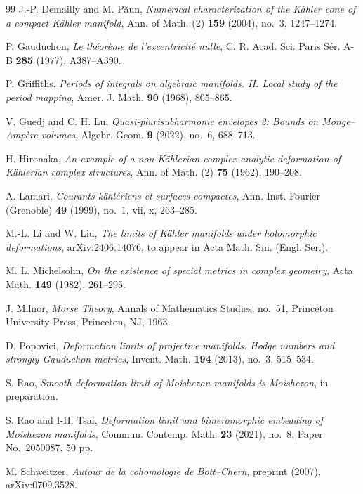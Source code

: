 \documentclass[11pt,letterpaper]{amsart}
\numberwithin{equation}{section}
\begin{document}
\begin{thebibliography}{99}
J.-P. Demailly and M. P\u{a}un, \textit{Numerical characterization of the K\"ahler cone of a compact K\"ahler manifold}, Ann. of Math. (2) \textbf{159} (2004), no.~3, 1247--1274.

P. Gauduchon, \textit{Le th\'eor\`eme de l'excentricit\'e nulle}, C. R. Acad. Sci. Paris S\'er. A-B \textbf{285} (1977), A387--A390.

P. Griffiths, \textit{Periods of integrals on algebraic manifolds. II. Local study of the period mapping}, Amer. J. Math. \textbf{90} (1968), 805--865.

V. Guedj and C. H. Lu, \textit{Quasi-plurisubharmonic envelopes 2: Bounds on Monge--Amp\`ere volumes}, Algebr. Geom. \textbf{9} (2022), no.~6, 688--713.

H. Hironaka, \textit{An example of a non-K\"ahlerian complex-analytic deformation of K\"ahlerian complex structures}, Ann. of Math. (2) \textbf{75} (1962), 190--208.

A. Lamari, \textit{Courants k\"ahl\'eriens et surfaces compactes}, Ann. Inst. Fourier (Grenoble) \textbf{49} (1999), no.~1, vii, x, 263--285.

M.-L. Li and W. Liu, \textit{The limits of K\"ahler manifolds under holomorphic deformations}, arXiv:2406.14076, to appear in Acta Math. Sin. (Engl. Ser.).


M. L. Michelsohn, \textit{On the existence of special metrics in complex geometry}, Acta Math. \textbf{149} (1982), 261--295.

J. Milnor, \textit{Morse Theory}, Annals of Mathematics Studies, no.~51, Princeton University Press, Princeton, NJ, 1963.

D. Popovici, \textit{Deformation limits of projective manifolds: Hodge numbers and strongly Gauduchon metrics}, Invent. Math. \textbf{194} (2013), no.~3, 515--534.


 S. Rao, \textit{Smooth deformation limit of Moishezon manifolds is Moishezon}, in preparation.



S. Rao and I-H. Tsai, \textit{Deformation limit and bimeromorphic embedding of Moishezon manifolds}, Commun. Contemp. Math. \textbf{23} (2021), no.~8, Paper No.~2050087, 50 pp.

M. Schweitzer, \textit{Autour de la cohomologie de Bott--Chern}, preprint (2007), arXiv:0709.3528.


\end{thebibliography}
\end{document}
